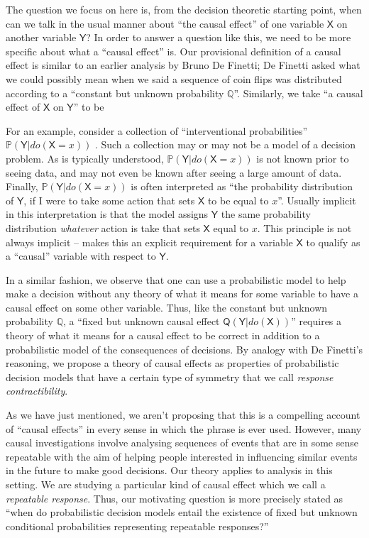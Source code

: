 \documentclass{article}
\theoremstyle{plain}
\theoremstyle{definition}
\newcommand{\RV}[1]{\ensuremath{\mathsf{#1}}}
\newcommand{\prob}[1]{\ensuremath{\mathbb{#1}}}
\begin{document}
The question we focus on here is, from the decision theoretic starting point, when can we talk in the usual manner about ``the causal effect'' of one variable $\RV{X}$ on another variable $\RV{Y}$? In order to answer a question like this, we need to be more specific about what a ``causal effect'' is. Our provisional definition of a causal effect is similar to an earlier analysis by Bruno De Finetti; De Finetti asked what we could possibly mean when we said a sequence of coin flips was distributed according to a ``constant but unknown probability $\prob{Q}$''\citet{de_finetti_foresight_1992}. Similarly, we take ``a causal effect of $\RV{X}$ on $\RV{Y}$'' to be



For an example, consider a collection of ``interventional probabilities'' $\prob{P}(\RV{Y}|do(\RV{X}=x))$ \citep[chap. 1.3]{pearl_causality:_2009}. Such a collection may or may not be a model of a decision problem. As is typically understood, $\prob{P}(\RV{Y}|do(\RV{X}=x))$ is not known prior to seeing data, and may not even be known after seeing a large amount of data. Finally, $\prob{P}(\RV{Y}|do(\RV{X}=x))$ is often interpreted as ``the probability distribution of $\RV{Y}$, if I were to take some action that sets $\RV{X}$ to be equal to $x$''. Usually implicit in this interpretation is that the model assigns $\RV{Y}$ the same probability distribution \emph{whatever} action is take that sets $\RV{X}$ equal to $x$. This principle is not always implicit -- \citet{chalupka_causal_2017} makes this an explicit requirement for a variable $\RV{X}$ to qualify as a ``causal'' variable with respect to $\RV{Y}$.

In a similar fashion, we observe that one can use a probabilistic model to help make a decision without any theory of what it means for some variable to have a causal effect on some other variable. Thus, like the constant but unknown probability $\prob{Q}$, a ``fixed but unknown causal effect $\RV{Q}(\RV{Y}|do(\RV{X}))$'' requires a theory of what it means for a causal effect to be correct in addition to a probabilistic model of the consequences of decisions. By analogy with De Finetti's reasoning, we propose a theory of causal effects as properties of probabilistic decision models that have a certain type of symmetry that we call \emph{response contractibility}.

As we have just mentioned, we aren't proposing that this is a compelling account of ``causal effects'' in every sense in which the phrase is ever used. However, many causal investigations involve analysing sequences of events that are in some sense repeatable with the aim of helping people interested in influencing similar events in the future to make good decisions. Our theory applies to analysis in this setting. We are studying a particular kind of causal effect which we call a \emph{repeatable response}. Thus, our motivating question is more precisely stated as ``when do probabilistic decision models entail the existence of fixed but unknown conditional probabilities representing repeatable responses?''
\end{document}
